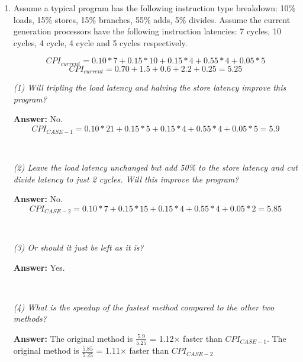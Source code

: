 \documentclass[12pt]{article}
\newenvironment{QandA}{\begin{enumerate}[label=\bfseries\arabic*.]\bfseries}
                      {\end{enumerate}}
\newenvironment{answered}{\par\quad\normalfont}{}
\begin{document}
\begin{QandA}
   \item Assume a typical program has the following instruction type breakdown: 10\% loads, 15\% stores, 15\% branches, 55\% adds, 5\% divides. Assume the current generation processors have the following instruction latencies: 7 cycles, 10 cycles, 4 cycle, 4 cycle and 5 cycles respectively. 
        \begin{answered}
        \begin{equation*}
            CPI_{current} = 0.10 * 7 + 0.15 * 10 + 0.15 * 4 + 0.55 * 4 + 0.05 * 5
        \end{equation*}
        \begin{equation*}
            CPI_{current} = 0.70 + 1.5 + 0.6 + 2.2 + 0.25 = 5.25
        \end{equation*}
        
        \textit{(1) Will tripling the load latency and halving the store latency improve this program?}
        
        \textbf{Answer:} No.
        \begin{equation*}
            CPI_{CASE-1} = 0.10 * 21 + 0.15 * 5 + 0.15 * 4 + 0.55 * 4 + 0.05 * 5 = 5.9
        \end{equation*}
        
        \ 
        
        \textit{(2) Leave the load latency unchanged but add 50\% to the store latency and cut divide latency to just 2 cycles. Will this improve the program?}
        
        \textbf{Answer:} No.
        \begin{equation*}
            CPI_{CASE-2} = 0.10 * 7 + 0.15 * 15 + 0.15 * 4 + 0.55 * 4 + 0.05 * 2 = 5.85
        \end{equation*}
        
        \ 
        
        \textit{(3) Or should it just be left as it is?}
        
        \textbf{Answer:} Yes.
        
        \ 
        
        \textit{(4) What is the speedup of the fastest method compared to the other two methods?}
        
        \textbf{Answer:} The original method is $\frac{5.9}{5.25}$ = 1.12$\times$ faster than $CPI_{CASE-1}$. The original method is $\frac{5.85}{5.25}$ = 1.11$\times$ faster than $CPI_{CASE-2}$
        
        
        \end{answered}
\end{QandA}
\end{document}
